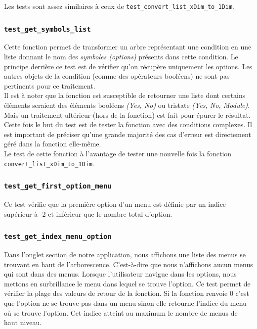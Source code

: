 \documentclass[17pts]{report}
\begin{document}
Les tests sont assez similaires à ceux de
\verb|test_convert_list_xDim_to_1Dim|. \\

\subsubsection{\texttt{test\_get\_symbols\_list}}
\label{ssub:TestGetSymbolsList}
Cette fonction permet de transformer un arbre représentant une condition en une
liste donnant le nom des \textit{symboles (options)} présents dans cette
condition. Le principe derrière ce test est de vérifier qu'on récupère
uniquement les options. Les autres objets de la condition (comme des opérateurs
booléens) ne sont pas pertinents pour ce traitement.\\ Il est à noter que la
fonction est susceptible de retourner une liste dont certains éléments seraient
des éléments booléens \textit{(Yes, No)} ou tristate \textit{(Yes, No,
Module)}.  Mais un traitement ultérieur (hors de la fonction) est fait pour
épurer le résultat.\\

Cette fois le but du test est de tester la fonction avec des conditions
complexes. Il est important de préciser qu'une grande majorité des cas d'erreur
est directement géré dans la fonction elle-même.\\

Le test de cette fonction à l'avantage de tester une nouvelle fois la fonction
\verb|convert_list_xDim_to_1Dim|.

\subsubsection{\texttt{test\_get\_first\_option\_menu}}
\label{ssub:TestGetFirstOptionMenu}
Ce test vérifie que la première option d'un menu est définie par un indice
supérieur à -2 et inférieur que le nombre total d'option.

\subsubsection{\texttt{test\_get\_index\_menu\_option}}
\label{ssub:TestGetIndexMenuOption}
Dans l'onglet section de notre application, nous affichons une liste des menus
se trouvant en haut de l'arborescence. C'est-à-dire que nous n'affichons aucun
menus qui sont dans des menus. Lorsque l'utilisateur navigue dans les options,
nous mettons en surbrillance le menu dans lequel se trouve l'option.  Ce test
permet de vérifier la plage des valeurs de retour de la fonction.  Si la
fonction renvoie 0 c'est que l'option ne se trouve pas dans un menu sinon elle
retourne l'indice du menu où se trouve l'option. Cet indice atteint au
maximum le nombre de menus de haut niveau.
\end{document}
